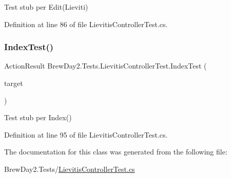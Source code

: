 Test stub per Edit(\+Lieviti)



Definition at line 86 of file Lievitis\+Controller\+Test.\+cs.

\mbox{\label{class_brew_day2_1_1_tests_1_1_lievitis_controller_test_a43ff1f01da9e7fab9628a6f9aa05a7ad}} 
\subsubsection{\texorpdfstring{Index\+Test()}{IndexTest()}}
{\footnotesize\ttfamily Action\+Result Brew\+Day2.\+Tests.\+Lievitis\+Controller\+Test.\+Index\+Test (\begin{DoxyParamCaption}\item[{\mbox{[}\+Pex\+Assume\+Under\+Test\mbox{]} \mbox{\hyperlink{class_brew_day2_1_1_controllers_1_1_lievitis_controller}{Lievitis\+Controller}}}]{target }\end{DoxyParamCaption})}



Test stub per Index()



Definition at line 95 of file Lievitis\+Controller\+Test.\+cs.



The documentation for this class was generated from the following file\+:\begin{DoxyCompactItemize}
\item 
Brew\+Day2.\+Tests/\mbox{\hyperlink{_lievitis_controller_test_8cs}{Lievitis\+Controller\+Test.\+cs}}\end{DoxyCompactItemize}

